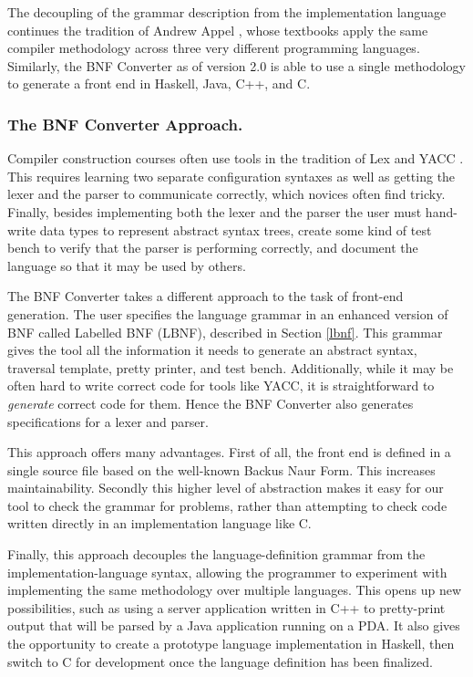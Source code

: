 \documentclass{llncs}
\newcommand{\shortsection}[1]{\subsubsection*{#1.}} %
\begin{document}
The decoupling of the grammar description from the implementation language  continues the tradition of Andrew Appel \cite{AppelC,AppelJ,appel}, whose textbooks apply the same compiler methodology across three very different programming languages. Similarly, the BNF Converter as of version 2.0 is able to use a single methodology to generate a front end in Haskell, Java, C++, and C.

\shortsection{The BNF Converter Approach}

Compiler construction courses often use tools in the tradition of 
Lex \cite{lesk-lex} and 
YACC \cite{johnson-yacc}. 
This requires learning two separate configuration syntaxes as well as getting the lexer and the parser to communicate correctly, which novices often find tricky. 
Finally, besides implementing both the lexer and the parser the user must  hand-write data types to represent abstract syntax trees, create some kind of test bench to verify that the parser is performing correctly, and document the language so that it may be used by others.

The BNF Converter takes a different approach to the task of front-end
generation. The user specifies the language grammar in an enhanced
version of BNF called Labelled BNF (LBNF), described in Section \ref{lbnf}. This grammar gives the
tool all the information it needs to generate an abstract syntax, traversal template, pretty printer, and test bench. Additionally, while it may be often hard to write correct code for tools like YACC, it is straightforward to {\em generate} correct code for them. Hence the BNF Converter also generates specifications for a lexer and parser.

This approach offers many advantages. First of all, the front end is defined in a
single source file based on the well-known Backus Naur Form. This increases maintainability. Secondly this higher level of abstraction makes it easy for our tool to check the grammar for problems, rather than attempting to check code written directly in an implementation language like C.

Finally, this approach decouples the language-definition grammar from the implementation-language syntax, allowing the programmer to
experiment with implementing the same methodology over multiple languages. This opens up new possibilities, such as using a server application written in C++ to pretty-print output that will be parsed by a Java application running on a PDA. It also gives the opportunity to create a prototype language implementation in Haskell, then switch to C for development once the language definition has been finalized.
\end{document}
